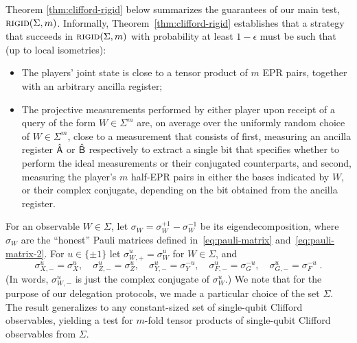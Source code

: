 Theorem \ref{thm:clifford-rigid} below summarizes the guarantees of our main
test,  $\textsc{rigid}(\Sigma,m)$. Informally, Theorem~\ref{thm:clifford-rigid} establishes that a strategy that succeeds in $\textsc{rigid}(\Sigma,m)$ with probability at least  $1-\epsilon$ must be such that (up to local isometries):
\begin{itemize}
    \item The players' joint state is close to a tensor product of $m$ EPR pairs, together with an arbitrary ancilla register;
    \item The projective measurements performed by either player upon receipt of a query of the form $W\in\Sigma^m$ are, on average over the uniformly random choice of $W\in\Sigma^m$, close to a measurement that consists of first, measuring an ancilla register $\hat{{\textsf{A}}}$ or $\hat{{\textsf{B}}}$ respectively to extract a single bit that specifies whether to perform the ideal measurements or their conjugated counterparts, and second, measuring the player's $m$ half-EPR pairs in either the bases indicated by $W$, or their complex conjugate, depending on the bit obtained from the ancilla register. 
\end{itemize}

For an observable $W\in\Sigma$, let $\sigma_W = \sigma_W^{+1} - \sigma_W^{-1}$ be its eigendecomposition, where $\sigma_W$ are the ``honest'' Pauli matrices defined in~\eqref{eq:pauli-matrix} and~\eqref{eq:pauli-matrix-2}. For $u\in\{\pm 1\}$ let $\sigma_{W,+}^u = \sigma_W^u$ for $W\in \Sigma$, and 
$$ \sigma_{X,-}^u = \sigma_X^u,\quad\sigma_{Z,-}^u = \sigma_Z^u,\quad\sigma_{Y,-}^u = \sigma_Y^{-u},\quad\sigma_{F,-}^u = \sigma_G^{-u},\quad\sigma_{G,-}^u = \sigma_F^{-u}\;.$$
(In words, $\sigma_{W,-}^u$ is just the complex conjugate of $\sigma_W^u$.) We note that for the purpose of our delegation protocols, we made a particular choice of the set $\Sigma$. The result generalizes to any constant-sized set of single-qubit Clifford observables,  yielding a test for $m$-fold tensor products of single-qubit Clifford observables from $\Sigma$.

